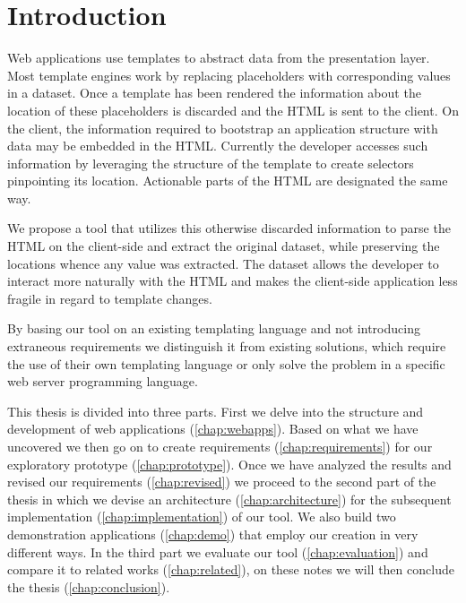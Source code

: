 \documentclass[thesis.tex]{subfiles}
\begin{document}
\chapter{Introduction}
\label{chap:intro}
Web applications use templates to abstract data from the presentation layer.
Most template engines work by replacing placeholders with corresponding values
in a dataset.
Once a template has been rendered the information about the location of these
placeholders is discarded and the HTML is sent to the client.
On the client, the information required to bootstrap an application structure
with data may be embedded in the HTML. Currently the developer accesses such
information by leveraging the structure of the template to create selectors
pinpointing its location. Actionable parts of the HTML are designated the same
way.

We propose a tool that utilizes this otherwise discarded information to parse
the HTML on the client-side and extract the original dataset, while preserving
the locations whence any value was extracted. The dataset allows the developer
to interact more naturally with the HTML and makes the client-side application
less fragile in regard to template changes.

By basing our tool on an existing templating language and not introducing
extraneous requirements we distinguish it from existing solutions,
which require the use of their own templating language or only solve the problem
in a specific web server programming language.


This thesis is divided into three parts. First we delve into the structure
and development of web applications (\ref{chap:webapps}). Based on what we have
uncovered we then go on to create requirements (\ref{chap:requirements}) for our
exploratory prototype (\ref{chap:prototype}).
Once we have analyzed the results and revised our requirements
(\ref{chap:revised}) we proceed to the second part of the thesis in which we
devise an architecture (\ref{chap:architecture}) for the subsequent
implementation (\ref{chap:implementation}) of our tool. We also build two
demonstration applications (\ref{chap:demo}) that employ our creation in very
different ways.
In the third part we evaluate our tool (\ref{chap:evaluation}) and
compare it to related works (\ref{chap:related}), on these notes we will then
conclude the thesis (\ref{chap:conclusion}).
\end{document}
